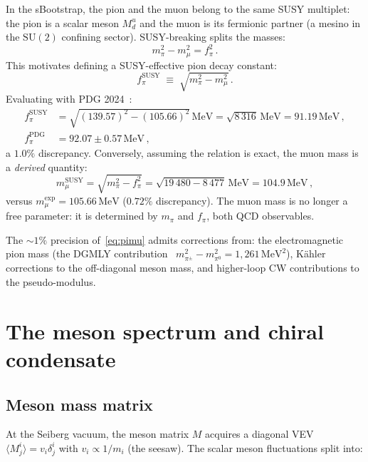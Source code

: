 \documentclass[12pt,a4paper]{article}
\newcommand{\MeV}{\,\text{MeV}}
\newcommand{\fpi}{f_\pi}
\begin{document}
In the sBootstrap, the pion and the muon belong to the same SUSY
multiplet: the pion is a scalar meson $M^u_d$ and the muon is its
fermionic partner (a mesino in the $\mathrm{SU}(2)$ confining
sector). SUSY-breaking splits the masses:
\begin{equation}
  m_\pi^2 - m_\mu^2 = \fpi^2\,.
  \label{eq:pimu}
\end{equation}
This motivates defining a SUSY-effective pion decay constant:
\begin{equation}
  \fpi^{\text{SUSY}} \;\equiv\; \sqrt{m_\pi^2 - m_\mu^2}\,.
\end{equation}
Evaluating with PDG 2024~\cite{PDG2024}:
\begin{align}
  \fpi^{\text{SUSY}}
  &= \sqrt{(139.57)^2 - (105.66)^2}\MeV
   = \sqrt{8\,316}\MeV
   = 91.19\MeV\,,\\
  \fpi^{\text{PDG}} &= 92.07 \pm 0.57\MeV\,,
\end{align}
a $1.0\%$ discrepancy.  Conversely, assuming the relation is exact,
the muon mass is a \emph{derived} quantity:
\begin{equation}
  m_\mu^{\text{SUSY}} = \sqrt{m_\pi^2 - \fpi^2}
  = \sqrt{19\,480 - 8\,477}\MeV
  = 104.9\MeV\,,
  \label{eq:mu_pred}
\end{equation}
versus $m_\mu^{\text{exp}} = 105.66\MeV$ ($0.72\%$ discrepancy).
The muon mass is no longer a free parameter: it is determined by
$m_\pi$ and $\fpi$, both QCD observables.

The $\sim 1\%$ precision of~\eqref{eq:pimu} admits corrections from:
the electromagnetic pion mass (the DGMLY
contribution~\cite{DGMLY1967}
$m_{\pi^\pm}^2 - m_{\pi^0}^2 = 1{,}261\MeV^2$),
Kähler corrections to the off-diagonal meson mass, and
higher-loop CW contributions to the pseudo-modulus.

\section{The meson spectrum and chiral condensate}
\label{sec:mesons}

\subsection{Meson mass matrix}

At the Seiberg vacuum, the meson matrix $M$ acquires a diagonal VEV
$\langle M^i_j \rangle = v_i\delta^i_j$ with $v_i \propto 1/m_i$
(the seesaw).  The scalar meson fluctuations split into:
\end{document}
